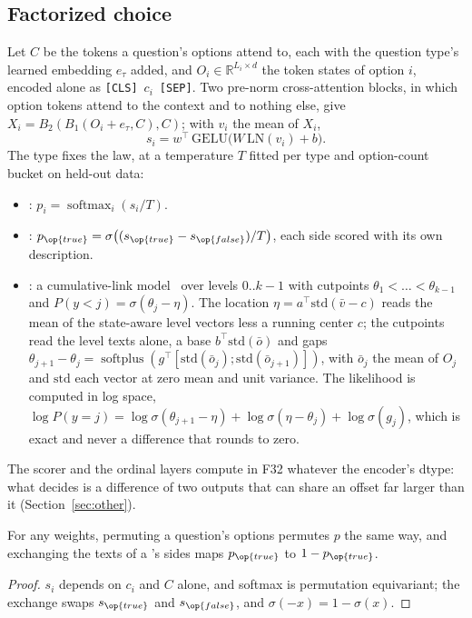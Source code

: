 \subsection{Factorized choice}
\label{sec:factor}

Let $C$ be the tokens a question's options attend to, each with the question
type's learned embedding $e_\tau$ added, and $O_i \in \mathbb{R}^{L_i\times d}$
the token states of option $i$, encoded alone as
\texttt{[CLS]}~$c_i$~\texttt{[SEP]}. Two pre-norm cross-attention blocks, in
which option tokens attend to the context and to nothing else, give
$X_i = B_2(B_1(O_i + e_\tau, C), C)$; with $v_i$ the mean of $X_i$,
\begin{equation}
  s_i = w^{\top}\,\mathrm{GELU}\bigl(W\,\mathrm{LN}(v_i) + b\bigr).
\end{equation}
The type fixes the law, at a temperature $T$ fitted per type and option-count
bucket on held-out data:
\begin{itemize}[leftmargin=1.5em]
  \item {}: $p_i = \operatorname{softmax}_i(s_i/T)$.
  \item {}: $p_{\op{true}} = \sigma\bigl((s_{\op{true}} -
    s_{\op{false}})/T\bigr)$, each side scored with its own description.
  \item {}: a cumulative-link model~\cite{mccullagh1980} over levels
    $0..k-1$ with cutpoints $\theta_1 < \dots < \theta_{k-1}$ and
    $P(y < j) = \sigma(\theta_j - \eta)$. The location $\eta = a^{\top}
    \mathrm{std}(\bar v - c)$ reads the mean of the state-aware level vectors
    less a running center $c$; the cutpoints read the level texts alone, a base
    $b^{\top}\mathrm{std}(\bar o)$ and gaps
    $\theta_{j+1} - \theta_j = \operatorname{softplus}(g^{\top}
    [\mathrm{std}(\bar o_j); \mathrm{std}(\bar o_{j+1})])$, with $\bar o_j$ the
    mean of $O_j$ and $\mathrm{std}$ each vector at zero mean and unit variance.
    The likelihood is computed in log space,
    $\log P(y = j) = \log\sigma(\theta_{j+1} - \eta) + \log\sigma(\eta -
    \theta_j) + \log\sigma(g_j)$, which is exact and never a difference that
    rounds to zero.
\end{itemize}
The scorer and the ordinal layers compute in F32 whatever the encoder's dtype:
what decides is a difference of two outputs that can share an offset far larger
than it (Section~\ref{sec:other}).

\begin{proposition}[Symmetry]
\label{prop:symmetry}
For any weights, permuting a question's options permutes $p$ the same way, and
exchanging the texts of a 's sides maps $p_{\op{true}}$ to
$1 - p_{\op{true}}$.
\end{proposition}
\begin{proof}
$s_i$ depends on $c_i$ and $C$ alone, and softmax is permutation equivariant;
the exchange swaps $s_{\op{true}}$ and $s_{\op{false}}$, and
$\sigma(-x) = 1 - \sigma(x)$.
\end{proof}

